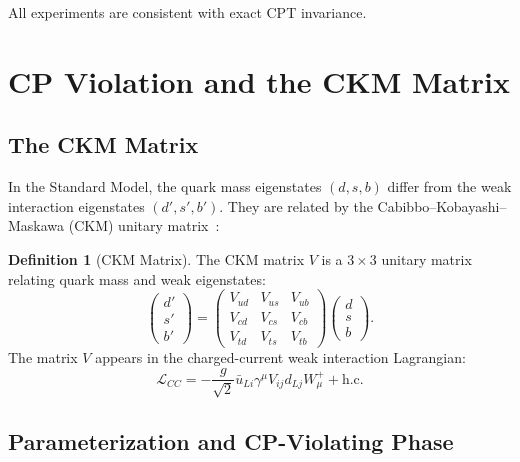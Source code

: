 \documentclass[12pt]{article}
\theoremstyle{definition}
\newtheorem{definition}[theorem]{Definition}
\theoremstyle{remark}
\newcommand{\Lagr}{\mathcal{L}}
\begin{document}
All experiments are consistent with exact CPT invariance.

\section{CP Violation and the CKM Matrix}
\label{sec:cp_violation}

\subsection{The CKM Matrix}

In the Standard Model, the quark mass eigenstates $(d, s, b)$ differ from the weak
interaction eigenstates $(d', s', b')$. They are related by the
Cabibbo--Kobayashi--Maskawa (CKM) unitary matrix~\cite{Cabibbo1963,KobayashiMaskawa1973}:

\begin{definition}[CKM Matrix]
\label{def:ckm}
The CKM matrix $V$ is a $3 \times 3$ unitary matrix relating quark mass and weak
eigenstates:
\begin{equation}
\label{eq:ckm_def}
\begin{pmatrix} d' \\ s' \\ b' \end{pmatrix} =
\begin{pmatrix} V_{ud} & V_{us} & V_{ub} \\
V_{cd} & V_{cs} & V_{cb} \\
V_{td} & V_{ts} & V_{tb} \end{pmatrix}
\begin{pmatrix} d \\ s \\ b \end{pmatrix}.
\end{equation}
The matrix $V$ appears in the charged-current weak interaction Lagrangian:
\begin{equation}
\Lagr_{CC} = -\frac{g}{\sqrt{2}} \bar{u}_{Li} \gamma^\mu V_{ij} d_{Lj} W^+_\mu + \text{h.c.}
\end{equation}
\end{definition}

\subsection{Parameterization and CP-Violating Phase}
\end{document}

